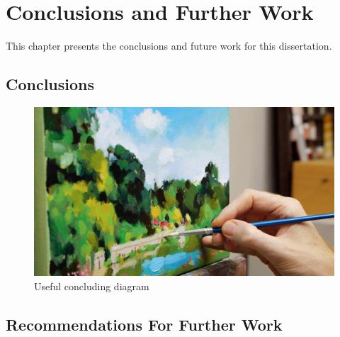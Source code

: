 \chapter{\label{ch:conclusions} Conclusions and Further Work}

This chapter presents the conclusions and future work for this dissertation.

\section{Conclusions}

\begin{figure}[!ht]
	\centering
	\includegraphics[width=1.0\textwidth]{ch6/figs/picture.jpg}
	\caption{Useful concluding diagram}
	\label{fig:picture1}
\end{figure}

\section{Recommendations For Further Work}



